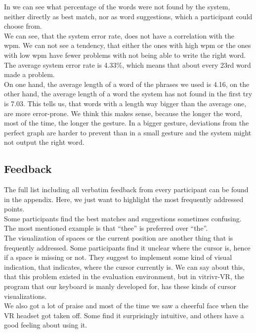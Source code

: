 In  we can see what percentage of the words were not found by the system, neither directly as best match, nor as word suggestions, which a participant could choose from.\\
We can see, that the system error rate, does not have a correlation with the wpm. We can not see a tendency, that either the ones with high wpm or the ones with low wpm have fewer problems with not being able to write the right word. The average system error rate is 4.33\%, which means that about every 23rd word made a problem.\\
On one hand, the average length of a word of the phrases we used is 4.16, on the other hand, the average length of a word the system has not found in the first try is 7.03. This tells us, that words with a length way bigger than the average one, are more error-prone. We think this makes sense, because the longer the word, most of the time, the longer the gesture. In a bigger gesture, deviations from the perfect graph are harder to prevent than in a small gesture and the system might not output the right word.

\subsection{Feedback}
The full list including all verbatim feedback from every participant can be found in the appendix. Here, we just want to highlight the most frequently addressed points.\\
Some participants find the best matches and suggestions sometimes confusing. The most mentioned example is that ``thee'' is preferred over ``the''.\\
The visualization of spaces or the current position are another thing that is frequently addressed. Some participants find it unclear where the cursor is, hence if a space is missing or not. They suggest to implement some kind of visual indication, that indicates, where the cursor currently is. We can say about this, that this problem existed in the evaluation environment, but in vitrivr-VR, the program that our keyboard is manly developed for, has these kinds of cursor visualizations.\\
We also got a lot of praise and most of the time we saw a cheerful face when the VR headset got taken off. Some find it surprisingly intuitive, and others have a good feeling about using it.

